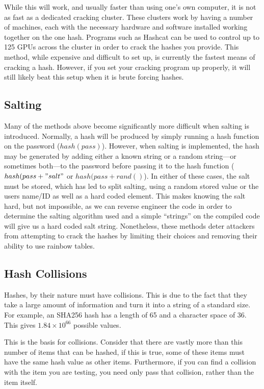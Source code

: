			While this will work, and usually faster than using one's own computer, it is not as fast as a dedicated cracking cluster. 
			These clusters work by having a number of machines, each with the necessary hardware and software installed working together on the one hash. 
			Programs such as Hashcat can be used to control up to 125 GPUs across the cluster in order to crack the hashes you provide. 
			This method, while expensive and difficult to set up, is currently the fastest means of cracking a hash. 
			However, if you set your cracking program up properly, it will still likely beat this setup when it is brute forcing hashes. 
		\subsection{Salting}
			Many of the methods above become significantly more difficult when salting is introduced. 
			Normally, a hash will be produced by simply running a hash function on the password ($hash(pass)$). 
			However, when salting is implemented, the hash may be generated by adding either a known string or a random string---or sometimes both---to the password before passing it to the hash function ($hash(pass + "salt"$ or $hash(pass + rand()$).
			In either of these cases, the salt must be stored, which has led to split salting, using a random stored value or the users name/ID as well as a hard coded element. 
			This makes knowing the salt hard, but not impossible, as we can reverse engineer the code in order to determine the salting algorithm used and a simple ``strings'' on the compiled code will give us a hard coded salt string. 
			Nonetheless, these methods deter attackers from attempting to crack the hashes by limiting their choices and removing their ability to use rainbow tables. 
		\subsection{Hash Collisions}
			Hashes, by their nature must have collisions. 
			This is due to the fact that they take a large amount of information and turn it into a string of a standard size. 
			For example, an SHA256 hash has a length of 65 and a character space of 36. 
			This gives $1.84\times10^{66}$ possible values. 

			This is the basis for collisions. 
			Consider that there are vastly more than this number of items that can be hashed, 
			if this is true, some of these items must have the same hash value as other items.
			Furthermore, if you can find a collision with the item you are testing, you need only pass that collision, rather than the item itself. 

